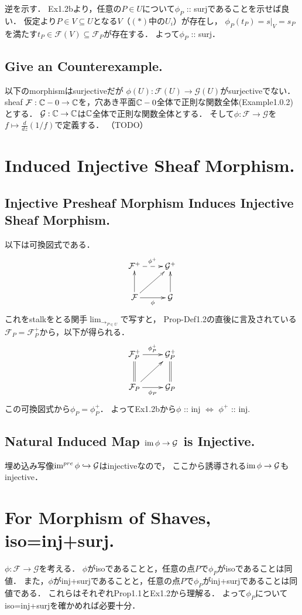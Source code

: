 \documentclass[a4paper]{jsarticle}
\newcommand{\shF}{\mathcal{F}}
\newcommand{\shG}{\mathcal{G}}
\begin{document}
    逆を示す．
    Ex1.2bより，任意の$P \in U$について$\phi_P$ :: surjであることを示せば良い．
    仮定より$P \in V \subseteq U$となる$V$（$(*)$中の$U_i$）が存在し，
    $\phi_P(t_P)=s|_V=s_P$を満たす$t_P \in \shF(V) \subseteq \shF_P$が存在する．
    よって$\phi_P$ :: surj．

    \subsection{Give an Counterexample.}
    以下のmorphismはsurjectiveだが
    $\phi(U): \shF(U) \to \shG(U)$がsurjectiveでない．
    sheaf $\shF:\C-0 \to \C$を，穴あき平面$\mathbb{C}-0$全体で正則な関数全体(Example1.0.2)とする．
    $\shG: \C \to \C$は$\mathbb{C}$全体で正則な関数全体とする．
    そして$\phi: \shF \to \shG$を$f \mapsto \frac{d}{dz}(1/f)$で定義する．
    （TODO）

\section{Induced Injective Sheaf Morphism.} %
    \subsection{Injective Presheaf Morphism Induces Injective Sheaf Morphism.}
    以下は可換図式である．
    \[
    \xymatrix
    {
        \shF^+ \ar@{-->}[r]^{\phi^+} & \shG^+ \\
        \shF \ar[u] \ar[r]_-{\phi} \ar[ur]& \shG \ar[u]
    }
    \]
    これをstalkをとる関手$\lim_{\to_{P \in U}}$で写すと，
    Prop-Def1.2の直後に言及されている$\shF_P=\shF_P^+$から，以下が得られる．
    \[
    \xymatrix
    {
        \shF_P^+ \ar[r]^{\phi_P^+} & \shG_P^+ \\
        \shF_P \ar@{=}[u] \ar[r]_-{\phi_P} \ar[ur]& \shG_P \ar@{=}[u]
    }
    \]
    この可換図式から$\phi_P=\phi_P^+$．
    よってEx1.2bから$\phi$ :: inj $\iff$ $\phi^+$ :: inj.

    \subsection{Natural Induced Map $\im \phi \to \shG$ is Injective.}
    埋め込み写像$\im^{pre} \phi \hookrightarrow \shG$はinjectiveなので，
    ここから誘導される$\im \phi \to \shG$もinjective．

\section{For Morphism of Shaves, iso=inj+surj.} %
    $\phi: \shF \to \shG$を考える．
    $\phi$がisoであることと，任意の点$P$で$\phi_P$がisoであることは同値．
    また，$\phi$がinj+surjであることと，任意の点$P$で$\phi_P$がinj+surjであることは同値である．
    これらはそれぞれProp1.1とEx1.2から理解る．
    よって$\phi_P$についてiso=inj+surjを確かめれば必要十分．
    
\end{document}
